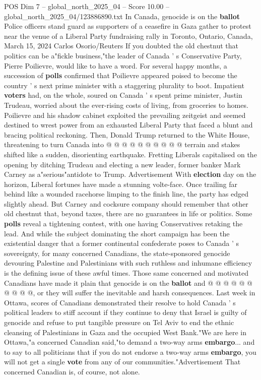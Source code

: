 \begin{textsample}{POS Dim 7 – global\_north\_2025\_04 – Score 10.00 – global\_north\_2025\_04/123886890.txt}  \label{ex:f7_pos_357}
In Canada, genocide is on the \textbf{ballot} Police officers stand guard as supporters of a ceasefire in Gaza gather to protest near the venue of a Liberal Party fundraising rally in Toronto, Ontario, Canada, March 15, 2024 Carlos Osorio/Reuters If you doubted the old chestnut that politics can be a"fickle business,"the leader of Canada ' s Conservative Party, Pierre Poilievre, would like to have a word.
For several happy months, a succession of \textbf{polls} confirmed that Poilievre appeared poised to become the country ' s next prime minister with a staggering plurality to boot.
Impatient \textbf{voters} had, on the whole, soured on Canada ' s spent prime minister, Justin Trudeau, worried about the ever-rising costs of living, from groceries to homes.
Poilievre and his shadow cabinet exploited the prevailing zeitgeist and seemed destined to wrest power from an exhausted Liberal Party that faced a blunt and bracing political reckoning.
Then, Donald Trump returned to the White House, threatening to turn Canada into @ @ @ @ @ @ @ @ @ @ terrain and stakes shifted like a sudden, disorienting earthquake.
Fretting Liberals capitalised on the opening by ditching Trudeau and electing a new leader, former banker Mark Carney as a"serious"antidote to Trump.
Advertisement With \textbf{election} day on the horizon, Liberal fortunes have made a stunning volte-face.
Once trailing far behind like a wounded racehorse limping to the finish line, the party has edged slightly ahead.
But Carney and cocksure company should remember that other old chestnut that, beyond taxes, there are no guarantees in life or politics.
Some \textbf{polls} reveal a tightening contest, with one having Conservatives retaking the lead.
And while the subject dominating the short campaign has been the existential danger that a former continental confederate poses to Canada ' s sovereignty, for many concerned Canadians, the state-sponsored genocide devouring Palestine and Palestinians with such ruthless and inhumane efficiency is the defining issue of these awful times.
Those same concerned and motivated Canadians have made it plain that genocide is on the \textbf{ballot} and @ @ @ @ @ @ @ @ @ @, or they will suffer the inevitable and harsh consequences.
Last week in Ottawa, scores of Canadians demonstrated their resolve to hold Canada ' s political leaders to stiff account if they continue to deny that Israel is guilty of genocide and refuse to put tangible pressure on Tel Aviv to end the ethnic cleansing of Palestinians in Gaza and the occupied West Bank."We are here in Ottawa,"a concerned Canadian said,"to demand a two-way arms \textbf{embargo}... and to say to all politicians that if you do not endorse a two-way arms \textbf{embargo}, you will not get a single \textbf{vote} from any of our communities."Advertisement That concerned Canadian is, of course, not alone.

\end{textsample}
